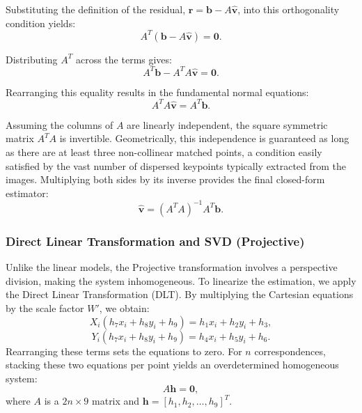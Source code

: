 Substituting the definition of the residual, $\mathbf{r} = \mathbf{b} - A\hat{\mathbf{v}}$, into this orthogonality condition yields:
\begin{equation}
A^T (\mathbf{b} - A\hat{\mathbf{v}}) = \mathbf{0}.
\end{equation}

Distributing $A^T$ across the terms gives:
\begin{equation}
A^T \mathbf{b} - A^T A \hat{\mathbf{v}} = \mathbf{0}.
\end{equation}

Rearranging this equality results in the fundamental normal equations:
\begin{equation}
A^T A \hat{\mathbf{v}} = A^T \mathbf{b}.
\end{equation}

Assuming the columns of $A$ are linearly independent, the square symmetric matrix $A^T A$ is invertible. Geometrically, this independence is guaranteed as long as there are at least three non-collinear matched points, a condition easily satisfied by the vast number of dispersed keypoints typically extracted from the images. Multiplying both sides by its inverse provides the final closed-form estimator:
\begin{equation}
\hat{\mathbf{v}} = (A^T A)^{-1}A^T \mathbf{b}.
\end{equation}

\subsubsection{Direct Linear Transformation and SVD (Projective)}
Unlike the linear models, the Projective transformation involves a perspective division, making the system inhomogeneous. To linearize the estimation, we apply the Direct Linear Transformation (DLT). By multiplying the Cartesian equations by the scale factor $W'$, we obtain:
\begin{equation}
X_i(h_7x_i + h_8y_i + h_9) = h_1x_i + h_2y_i + h_3,
\end{equation}
\begin{equation}
Y_i(h_7x_i + h_8y_i + h_9) = h_4x_i + h_5y_i + h_6.
\end{equation}
Rearranging these terms sets the equations to zero. For $n$ correspondences, stacking these two equations per point yields an overdetermined homogeneous system:
\begin{equation}
A\mathbf{h} = \mathbf{0},
\end{equation}
where $A$ is a $2n \times 9$ matrix and $\mathbf{h} = [h_1, h_2, \dots, h_9]^T$. 

